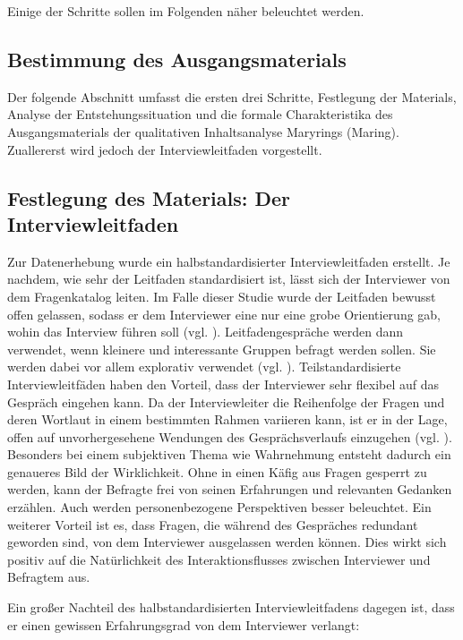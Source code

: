 \documentclass[12pt]{article}
\begin{document}
Einige der Schritte sollen im Folgenden näher beleuchtet werden.

\subsection{Bestimmung des Ausgangsmaterials}

Der folgende Abschnitt umfasst die ersten drei Schritte, \glqq Festlegung der Materials\grqq{}, \glqq Analyse der Entstehungssituation\grqq{} und die \glqq formale Charakteristika des Ausgangsmaterials\grqq{} der qualitativen Inhaltsanalyse Maryrings (Maring). Zuallererst wird jedoch der Interviewleitfaden vorgestellt.

\subsection{Festlegung des Materials: Der Interviewleitfaden}

Zur Datenerhebung wurde ein halbstandardisierter Interviewleitfaden erstellt. Je nachdem, wie sehr der Leitfaden standardisiert ist, lässt sich der Interviewer von dem Fragenkatalog leiten. Im Falle dieser Studie wurde der Leitfaden bewusst offen gelassen, sodass er dem Interviewer eine nur eine grobe Orientierung gab, wohin das Interview führen soll (vgl. \cite[113]{flick1995qualitative}).
Leitfadengespräche werden dann verwendet, wenn kleinere und interessante Gruppen befragt werden sollen. Sie werden dabei vor allem explorativ verwendet (vgl. \cite[184]{winfried1999empirische}). Teilstandardisierte Interviewleitfäden haben den Vorteil, dass der Interviewer sehr flexibel auf das Gespräch eingehen kann. Da der Interviewleiter die Reihenfolge der Fragen und deren Wortlaut in einem bestimmten Rahmen variieren kann, ist er in der Lage, offen auf unvorhergesehene Wendungen des Gesprächsverlaufs einzugehen (vgl. \cite[113]{flick1995qualitative}). Besonders bei einem subjektiven Thema wie Wahrnehmung entsteht dadurch ein genaueres Bild der Wirklichkeit. Ohne in einen Käfig aus Fragen gesperrt zu werden, kann der Befragte frei von seinen Erfahrungen und relevanten Gedanken erzählen. Auch werden personenbezogene Perspektiven besser beleuchtet. Ein weiterer Vorteil ist es, dass Fragen, die während des Gespräches redundant geworden sind, von dem Interviewer ausgelassen werden können. Dies wirkt sich positiv auf die Natürlichkeit des Interaktionsflusses zwischen Interviewer und Befragtem aus.

Ein großer Nachteil des halbstandardisierten Interviewleitfadens dagegen ist, dass er einen gewissen Erfahrungsgrad von dem Interviewer verlangt:
\end{document}
